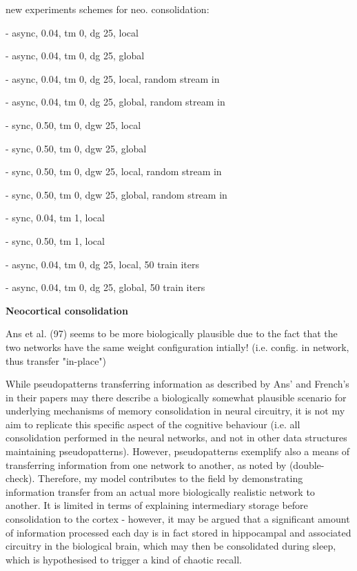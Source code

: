 new experiments schemes for neo. consolidation:

- async, 0.04, tm 0, dg 25, local

- async, 0.04, tm 0, dg 25, global

- async, 0.04, tm 0, dg 25, local, random stream in

- async, 0.04, tm 0, dg 25, global, random stream in

- sync, 0.50, tm 0, dgw 25, local

- sync, 0.50, tm 0, dgw 25, global

- sync, 0.50, tm 0, dgw 25, local, random stream in

- sync, 0.50, tm 0, dgw 25, global, random stream in

- sync, 0.04, tm 1, local

- sync, 0.50, tm 1, local

- async, 0.04, tm 0, dg 25, local, 50 train iters

- async, 0.04, tm 0, dg 25, global, 50 train iters



\textbf{Neocortical consolidation}

Ans et al. (97) seems to be more biologically plausible due to the fact that the two networks have the same weight configuration intially! (i.e. config. in network, thus transfer "in-place")

While pseudopatterns transferring information as described by Ans' and French's in their papers may there describe a biologically somewhat plausible scenario for underlying mechanisms of memory consolidation in neural circuitry, it is not my aim to replicate this specific aspect of the cognitive behaviour (i.e. all consolidation performed in the neural networks, and not in other data structures maintaining pseudopatterns). However, pseudopatterns exemplify also a means of transferring information from one network to another, as noted by \cite{Ans1997} (double-check). Therefore, my model contributes to the field by demonstrating information transfer from an actual more biologically realistic network to another. It is limited in terms of explaining intermediary storage before consolidation to the cortex - however, it may be argued that a significant amount of information processed each day is in fact stored in hippocampal and associated circuitry in the biological brain, which may then be consolidated during sleep, which is hypothesised to trigger a kind of chaotic recall.

